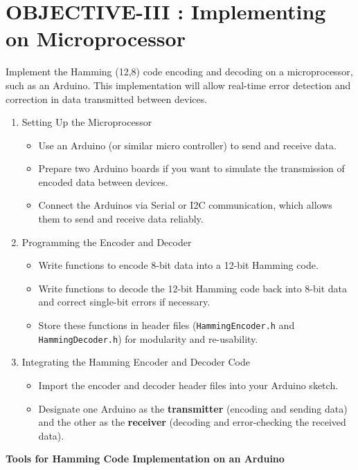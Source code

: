 \documentclass{article}
\begin{document}






 
    



\section{OBJECTIVE-III : Implementing on Microprocessor}
Implement the Hamming (12,8) code encoding and decoding on a microprocessor, such as an Arduino. This implementation will allow real-time error detection and correction in data transmitted between devices.
\begin{enumerate}
    \item {Setting Up the Microprocessor}
        \begin{itemize}
        \item Use an Arduino (or similar micro controller) to send and receive data.
        \item Prepare two Arduino boards if you want to simulate the transmission of encoded data between devices.
        \item Connect the Arduinos via Serial or I2C communication, which allows them to send and receive data reliably.
        \end{itemize}
    \item{Programming the Encoder and Decoder}
    \begin{itemize}
        \item Write functions to encode 8-bit data into a 12-bit Hamming code.
        \item Write functions to decode the 12-bit Hamming code back into 8-bit data and correct single-bit errors if necessary.
        \item Store these functions in header files (\texttt{HammingEncoder.h} and \texttt{HammingDecoder.h}) for modularity and re-usability.
    \end{itemize}
    \item {Integrating the Hamming Encoder and Decoder Code}
    \begin{itemize}
    \item Import the encoder and decoder header files into your Arduino sketch.
    \item Designate one Arduino as the \textbf{transmitter} (encoding and sending data) and the other as the \textbf{receiver} (decoding and error-checking the received data).
    \end{itemize}
\end{enumerate}
\textbf {Tools for Hamming Code Implementation on an Arduino}
\end{document}
